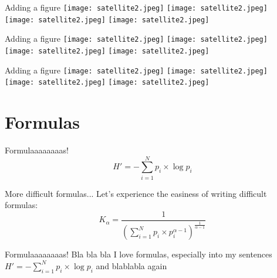 \documentclass{beamer}
\begin{document}
\begin{frame}{Adding a figure}
\centering
 \texttt{[image: satellite2.jpeg]}
 \texttt{[image: satellite2.jpeg]}\\
 \texttt{[image: satellite2.jpeg]}
  \texttt{[image: satellite2.jpeg]}\\
\end{frame}

\begin{frame}{Adding a figure}
\centering
 \texttt{[image: satellite2.jpeg]}
 \texttt{[image: satellite2.jpeg]}\\
 \bigskip
 \texttt{[image: satellite2.jpeg]}
  \texttt{[image: satellite2.jpeg]}\\
\end{frame}


\begin{frame}{Adding a figure}
\centering
 \texttt{[image: satellite2.jpeg]}
 \texttt{[image: satellite2.jpeg]}\\
 \smallskip
 \texttt{[image: satellite2.jpeg]}
  \texttt{[image: satellite2.jpeg]}\\
\end{frame}

\section{Formulas}


\begin{frame}{Formulaaaaaaaas!}
    \begin{equation}
        H' = - \sum_{i=1}^{N} p_i \times \log{p_i}
    \end{equation}
\end{frame}

\begin{frame}{More difficult formulas...}
Let's experience the easiness of writing difficult formulas:
\begin{equation}
K_{\alpha}=\frac{1}{\left( \sum_{i=1}^{N} p_i \times p_i^{\alpha-1} \right)^{\frac{1}{\alpha-1}}} 
\end{equation}
\end{frame}


\begin{frame}{Formulaaaaaaaas!}
Bla bla bla I love formulas, especially into my sentences
$H' = - \sum_{i=1}^{N} p_i \times \log{p_i}$ and blablabla again
\end{frame}
\end{document}
